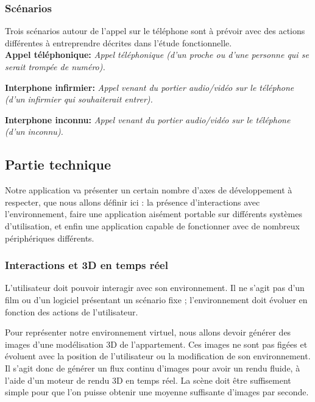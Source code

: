 \subsubsection{Scénarios}
Trois scénarios autour de l'appel sur le téléphone sont à prévoir avec des actions différentes à entreprendre décrites dans l'étude fonctionnelle. \\

\textbf{Appel téléphonique: }\textit{Appel téléphonique (d'un proche ou d'une personne qui se serait trompée de numéro). }

\textbf{Interphone infirmier: } \textit{Appel venant du portier audio/vidéo sur le téléphone (d'un infirmier qui souhaiterait entrer). }

\textbf{Interphone inconnu: } \textit{Appel venant du portier audio/vidéo sur le téléphone (d'un inconnu). }

\subsection{Partie technique}

Notre application va présenter un certain nombre d'axes de développement à respecter, que nous allons définir ici : la présence d'interactions avec l'environnement, faire une application aisément portable sur différents systèmes d'utilisation, et enfin une application capable de fonctionner avec de nombreux périphériques différents. 

\subsubsection{Interactions et 3D en temps réel}
L'utilisateur doit pouvoir interagir avec son environnement. Il ne s'agit pas d'un film ou d'un logiciel présentant un scénario fixe ; l'environnement doit évoluer en fonction des actions de l'utilisateur.

Pour représenter notre environnement virtuel, nous allons devoir générer des images d'une modélisation 3D de l'appartement. Ces images ne sont pas figées et évoluent avec la position de l'utilisateur ou la modification de son environnement. Il s'agit donc de générer un flux continu d'images pour avoir un rendu fluide, à l'aide d'un moteur de rendu 3D en temps réel. La scène doit être suffisement simple pour que l'on puisse obtenir une moyenne suffisante d'images par seconde.


